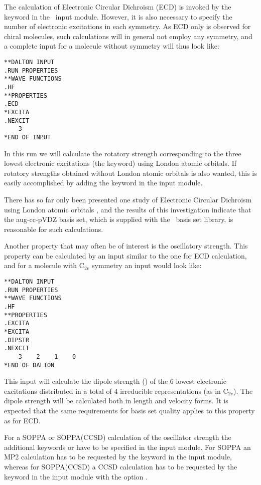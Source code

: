 The calculation of Electronic Circular Dichroism
(ECD) is invoked by 
the keyword  in the \aba\ input module. However,
it is also necessary to specify the number of electronic
excitations in 
each symmetry. As ECD only is observed for chiral molecules, such
calculations will in general not employ any symmetry, and a complete
input for a molecule without symmetry will thus look like:

\begin{verbatim}
**DALTON INPUT
.RUN PROPERTIES
**WAVE FUNCTIONS
.HF
**PROPERTIES
.ECD
*EXCITA
.NEXCIT
    3
*END OF INPUT
\end{verbatim}

In this run we will calculate the rotatory strength corresponding to 
the three lowest electronic excitations
(the  keyword) 
using London atomic orbitals. 
If rotatory strengths obtained without London atomic orbitals is also
wanted, this is easily accomplished by adding the keyword
 in the  input module.

There has so far only been presented one study of Electronic Circular
Dichroism using London atomic orbitals \cite{klbaehkrthjopjtca90}, and the
results of this investigation indicate that the aug-cc-pVDZ basis
set, which is supplied with the \siraba\ basis set library, is
reasonable for such calculations. 

Another property that may often be of interest is the
oscillatory strength. This property can be
calculated by an input 
similar to the one for ECD calculation, and for a molecule with
C$_{2v}$ symmetry an input would look like:

\begin{verbatim}
**DALTON INPUT
.RUN PROPERTIES
**WAVE FUNCTIONS
.HF
**PROPERTIES
.EXCITA
*EXCITA
.DIPSTR
.NEXCIT
    3    2    1    0
*END OF DALTON
\end{verbatim}

This input will calculate the dipole strength () of the
6 lowest electronic excitations distributed in a total of 4
irreducible representations (as in C$_{2v}$). The dipole strength will
be calculated both in 
length and velocity forms. It is expected that the same requirements
for basis set quality applies to this property as for ECD.

For a SOPPA or SOPPA(CCSD) calculation of
the oscillator strength the additional keywords  or
 have to be specified in the  input
module. For SOPPA an MP2 calculation has to be requested by the keyword
 in the  input module, whereas for SOPPA(CCSD) a
CCSD calculation has to be requested by the keyword  in the  input module with the  option
.

